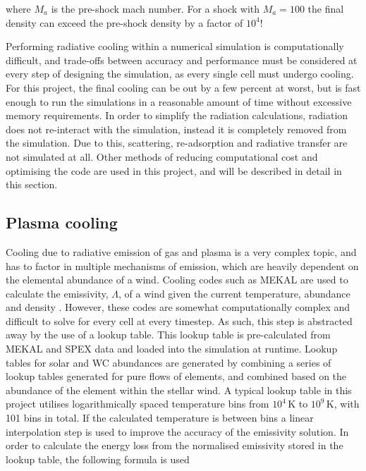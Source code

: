 \noindent
where $M_a$ is the pre-shock mach number.
For a shock with $M_a = 100$ the final density can exceed the pre-shock density by a factor of $10^4$!


Performing radiative cooling within a numerical simulation is computationally difficult, and trade-offs between accuracy and performance must be considered at every step of designing the simulation, as every single cell must undergo cooling.
For this project, the final cooling can be out by a few percent at worst, but is fast enough to run the simulations in a reasonable amount of time without excessive memory requirements.
In order to simplify the radiation calculations, radiation does not re-interact with the simulation, instead it is completely removed from the simulation.
Due to this, scattering, re-adsorption and radiative transfer are not simulated at all.
Other methods of reducing computational cost and optimising the code are used in this project, and will be described in detail in this section.

\subsection{Plasma cooling}

Cooling due to radiative emission of gas and plasma is a very complex topic, and has to factor in multiple mechanisms of emission, which are heavily dependent on the elemental abundance of a wind.
Cooling codes such as MEKAL are used to calculate the emissivity, $\Lambda$, of a wind given the current temperature, abundance and density
\parencite{meweCalculatedXradiationOptically1985,meweCalculatedXradiationOptically1986}.
However, these codes are somewhat computationally complex and difficult to solve for every cell at every timestep.
As such, this step is abstracted away by the use of a lookup table.
This lookup table is pre-calculated from MEKAL and SPEX data and loaded into the simulation at runtime.
Lookup tables for solar and WC abundances are generated by combining a series of lookup tables generated for pure flows of elements, and combined based on the abundance of the element within the stellar wind.
A typical lookup table in this project utilises logarithmically spaced temperature bins from $10^4\,\si{\kelvin}$ to $10^9\,\si{\kelvin}$, with 101 bins in total.
If the calculated temperature is between bins a linear interpolation step is used to improve the accuracy of the emissivity solution.
In order to calculate the energy loss from the normalised emissivity stored in the lookup table, the following formula is used


